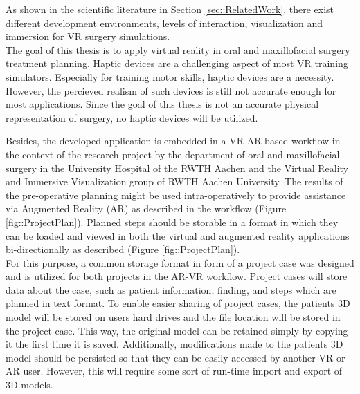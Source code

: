 As shown in the scientific literature in Section \ref{sec::RelatedWork}, there exist different development environments, levels of interaction, visualization and immersion for VR surgery simulations.
\\ The goal of this thesis is to apply virtual reality in oral and maxillofacial surgery treatment planning.
Haptic devices are a challenging aspect of most VR training simulators.
Especially for training motor skills, haptic devices are a necessity.
However, the percieved realism of such devices is still not accurate enough for most applications.
Since the goal of this thesis is not an accurate physical representation of surgery, no haptic devices will be utilized.

Besides, the developed application is embedded in a VR-AR-based workflow in the context of the research project by the department of oral and maxillofacial surgery in the University Hospital of the RWTH Aachen and the Virtual Reality and Immersive Visualization group of RWTH Aachen University.
The results of the pre-operative planning might be used intra-operatively to provide assistance via Augmented Reality (AR) as described in the workflow (Figure \ref{fig::ProjectPlan}).
Planned steps should be storable in a format in which they can be loaded and viewed in both the virtual and augmented reality applications bi-directionally as described (Figure \ref{fig::ProjectPlan}).
\\ For this purpose, a common storage format in form of a project case was designed and is utilized for both projects in the AR-VR workflow.
Project cases will store data about the case, such as patient information, finding, and steps which are planned in text format.
To enable easier sharing of project cases, the patients 3D model will be stored on users hard drives and the file location will be stored in the project case. 
This way, the original model can be retained simply by copying it the first time it is saved.
Additionally, modifications made to the patients 3D model should be persisted so that they can be easily accessed by another VR or AR user. 
However, this will require some sort of run-time import and export of 3D models.

